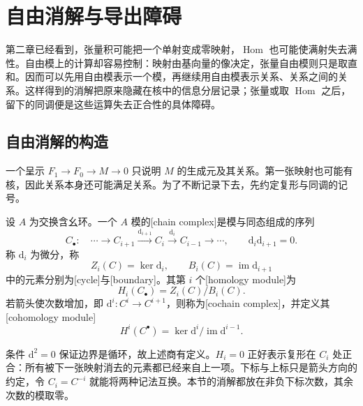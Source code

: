 
% 
% 

\section{自由消解与导出障碍}
\label{g5:sec:0801}

第二章已经看到，张量积可能把一个单射变成零映射，\(\operatorname{Hom}\) 也可能使满射失去满性。自由模上的计算却容易控制：映射由基向量的像决定，张量自由模则只是取直和。因而可以先用自由模表示一个模，再继续用自由模表示关系、关系之间的关系。这样得到的消解把原来隐藏在核中的信息分层记录；张量或取 \(\operatorname{Hom}\) 之后，留下的同调便是这些运算失去正合性的具体障碍。

\subsection{自由消解的构造}
\label{g5:subsec:0801:01}

一个呈示 \(F_1\to F_0\to M\to0\) 只说明 \(M\) 的生成元及其关系。第一张映射也可能有核，因此关系本身还可能满足关系。为了不断记录下去，先约定复形与同调的记号。

\begin{definition}\label{g5:def:module-complex}
	设 \(A\) 为交换含幺环。一个 \(A\) 模的[chain complex]是模与同态组成的序列
	\[
		C_\bullet:\quad\cdots\longrightarrow C_{i+1}
		\xrightarrow{\mathrm{d}_{i+1}}C_i\xrightarrow{\mathrm{d}_i}C_{i-1}
		\longrightarrow\cdots,
		\qquad \mathrm{d}_i \mathrm{d}_{i+1}=0.
	\]
	称 \(\mathrm{d}_i\) 为微分，称
	\[
		Z_i(C)=\ker \mathrm{d}_i,\qquad B_i(C)=\operatorname{im}\mathrm{d}_{i+1}
	\]
	中的元素分别为[cycle]与[boundary]。其第 \(i\) 个[homology module]为
	\[
		H_i(C_\bullet)=Z_i(C)/B_i(C).
	\]
	若箭头使次数增加，即 \(\mathrm{d}^i:C^i\to C^{i+1}\)，则称为[cochain complex]，并定义其[cohomology module]
	\[
		H^i(C^\bullet)=\ker \mathrm{d}^i/\operatorname{im}\mathrm{d}^{i-1}.
	\]
\end{definition}

条件 \(\mathrm{d}^2=0\) 保证边界是循环，故上述商有定义。\(H_i=0\) 正好表示复形在 \(C_i\) 处正合：所有被下一张映射消去的元素都已经来自上一项。下标与上标只是箭头方向的约定，令 \(C_i=C^{-i}\) 就能将两种记法互换。本节的消解都放在非负下标次数，其余次数的模取零。

